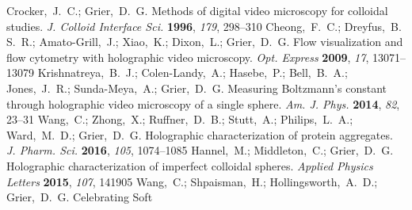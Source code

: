 \documentclass[journal=langd5,manuscript=article]{achemso}
\begin{document}
\begin{mcitethebibliography}{47}
\mciteBstWouldAddEndPuncttrue
\mciteSetBstMidEndSepPunct{\mcitedefaultmidpunct}
{\mcitedefaultendpunct}{\mcitedefaultseppunct}\relax
\EndOfBibitem
{}
Crocker,~J.~C.; Grier,~D.~G. Methods of digital video microscopy for colloidal
  studies. \emph{J. Colloid Interface Sci.} \textbf{1996}, \emph{179},
  298--310\relax
\mciteBstWouldAddEndPuncttrue
\mciteSetBstMidEndSepPunct{\mcitedefaultmidpunct}
{\mcitedefaultendpunct}{\mcitedefaultseppunct}\relax
\EndOfBibitem
{}
Cheong,~F.~C.; Dreyfus,~B. S.~R.; Amato-Grill,~J.; Xiao,~K.; Dixon,~L.;
  Grier,~D.~G. Flow visualization and flow cytometry with holographic video
  microscopy. \emph{Opt. Express} \textbf{2009}, \emph{17}, 13071--13079\relax
\mciteBstWouldAddEndPuncttrue
\mciteSetBstMidEndSepPunct{\mcitedefaultmidpunct}
{\mcitedefaultendpunct}{\mcitedefaultseppunct}\relax
\EndOfBibitem
{}
Krishnatreya,~B.~J.; Colen-Landy,~A.; Hasebe,~P.; Bell,~B.~A.; Jones,~J.~R.;
  Sunda-Meya,~A.; Grier,~D.~G. Measuring Boltzmann's constant through
  holographic video microscopy of a single sphere. \emph{Am. J. Phys.}
  \textbf{2014}, \emph{82}, 23--31\relax
\mciteBstWouldAddEndPuncttrue
\mciteSetBstMidEndSepPunct{\mcitedefaultmidpunct}
{\mcitedefaultendpunct}{\mcitedefaultseppunct}\relax
\EndOfBibitem
{}
Wang,~C.; Zhong,~X.; Ruffner,~D.~B.; Stutt,~A.; Philips,~L.~A.; Ward,~M.~D.;
  Grier,~D.~G. Holographic characterization of protein aggregates. \emph{J.
  Pharm. Sci.} \textbf{2016}, \emph{105}, 1074--1085\relax
\mciteBstWouldAddEndPuncttrue
\mciteSetBstMidEndSepPunct{\mcitedefaultmidpunct}
{\mcitedefaultendpunct}{\mcitedefaultseppunct}\relax
\EndOfBibitem
{}
Hannel,~M.; Middleton,~C.; Grier,~D.~G. Holographic characterization of
  imperfect colloidal spheres. \emph{Applied Physics Letters} \textbf{2015},
  \emph{107}, 141905\relax
\mciteBstWouldAddEndPuncttrue
\mciteSetBstMidEndSepPunct{\mcitedefaultmidpunct}
{\mcitedefaultendpunct}{\mcitedefaultseppunct}\relax
\EndOfBibitem
{}
Wang,~C.; Shpaisman,~H.; Hollingsworth,~A.~D.; Grier,~D.~G. Celebrating Soft

\end{mcitethebibliography}
\end{document}
